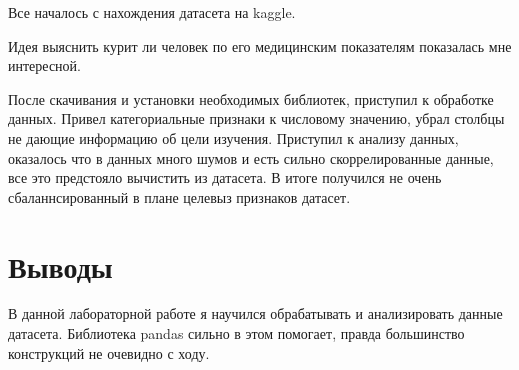 \documentclass[12pt]{article}
\begin{document}
Все началось с нахождения датасета на kaggle.

Идея выяснить курит ли человек по его медицинским показателям показалась мне интересной. 

После скачивания и установки необходимых библиотек, приступил к обработке данных. 
Привел категориальные признаки к числовому значению, убрал столбцы не дающие информацию об цели изучения.
Приступил к анализу данных, оказалось что в данных много шумов и есть сильно скоррелированные данные, все это предстояло вычистить из датасета.
В итоге получился не очень сбаланнсированный в плане целевыз признаков датасет.

\section{Выводы}
В данной лабораторной работе я научился обрабатывать и анализировать данные датасета. Библиотека pandas сильно в этом помогает, правда большинство конструкций не очевидно с ходу. 
\end{document}
